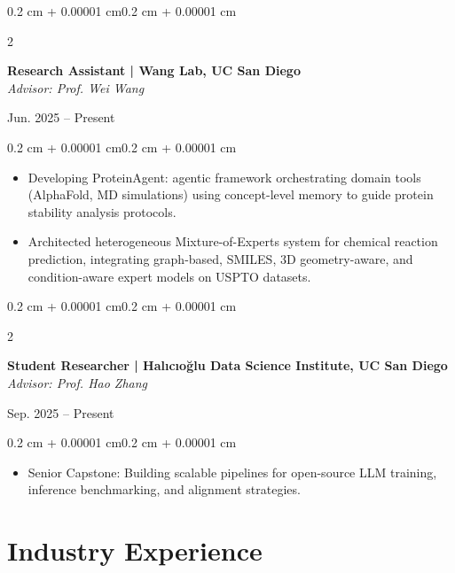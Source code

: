 \documentclass[10pt, letterpaper]{article}
\newenvironment{highlights}{
    \begin{itemize}[
        topsep=0.08 cm,
        parsep=0.08 cm,
        partopsep=0pt,
        itemsep=0pt,
        leftmargin=0.4 cm + 10pt
    ]
}{\end{itemize}}
\newenvironment{onecolentry}{
    \begin{adjustwidth}{0.2 cm + 0.00001 cm}{0.2 cm + 0.00001 cm}
}{\end{adjustwidth}}
\newenvironment{twocolentry}[2][]{
    \onecolentry
    \def\secondColumn{#2}
    \setcolumnwidth{\fill, 4.5 cm}
    \begin{paracol}{2}
}{
    \switchcolumn \raggedleft \secondColumn
    \end{paracol}
    \endonecolentry
}
\begin{document}
    \begin{twocolentry}{Jun. 2025 -- Present}
        \textbf{Research Assistant | Wang Lab, UC San Diego}\\
        \textit{Advisor: Prof. Wei Wang}
    \end{twocolentry}
    \vspace{0.08 cm}
    \begin{onecolentry}
        \begin{highlights}
            \item Developing ProteinAgent: agentic framework orchestrating domain tools (AlphaFold, MD simulations) using concept-level memory to guide protein stability analysis protocols.
            \item Architected heterogeneous Mixture-of-Experts system for chemical reaction prediction, integrating graph-based, SMILES, 3D geometry-aware, and condition-aware expert models on USPTO datasets.
        \end{highlights}
    \end{onecolentry}
    \vspace{0.15 cm}

    \begin{twocolentry}{Sep. 2025 -- Present}
        \textbf{Student Researcher | Halıcıo\u{g}lu Data Science Institute, UC San Diego}\\
        \textit{Advisor: Prof. Hao Zhang}
    \end{twocolentry}
    \vspace{0.08 cm}
    \begin{onecolentry}
        \begin{highlights}
            \item Senior Capstone: Building scalable pipelines for open-source LLM training, inference benchmarking, and alignment strategies.
        \end{highlights}
    \end{onecolentry}

    \section{Industry Experience}
\end{document}

